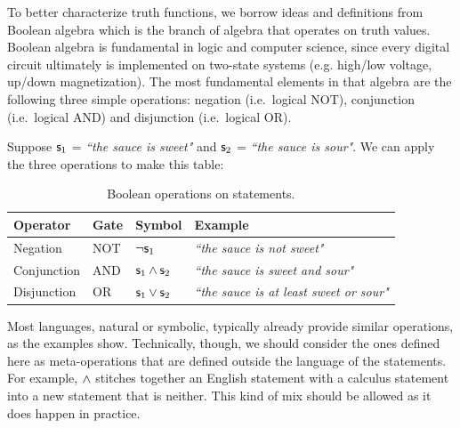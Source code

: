 To better characterize truth functions, we borrow ideas and definitions from Boolean algebra which is the branch of algebra that operates on truth values. Boolean algebra is fundamental in logic and computer science, since every digital circuit ultimately is implemented on two-state systems (e.g. high/low voltage, up/down magnetization).  The most fundamental elements in that algebra are the following three simple operations: negation (i.e.~logical NOT), conjunction (i.e.~logical AND) and disjunction (i.e.~logical OR).

Suppose $\mathsf{s}_1$ = \emph{``the sauce is sweet"} and $\mathsf{s}_2$ = \emph{``the sauce is sour"}. We can apply the three operations to make this table:

\begin{table}[h]
	\centering
	\begin{tabular}{p{} p{} p{} p{}}
		Operator & Gate & Symbol & Example \\ 
		\hline 
		Negation & NOT & $\neg \mathsf{s}_1$ &  \emph{``the sauce is not sweet"} \\ 
		Conjunction & AND & $\mathsf{s}_1 \wedge \mathsf{s}_2$ & \emph{``the sauce is sweet and sour"} \\ 
		Disjunction & OR & $\mathsf{s}_1 \vee \mathsf{s}_2$ & \emph{``the sauce is at least sweet or sour"}
	\end{tabular} 
	\caption{Boolean operations on statements.}
\end{table}

Most languages, natural or symbolic, typically already provide similar operations, as the examples show. Technically, though, we should consider the ones defined here as meta-operations that are defined outside the language of the statements. For example, $\wedge$ stitches together an English statement with a calculus statement into a new statement that is neither. This kind of mix should be allowed as it does happen in practice.

